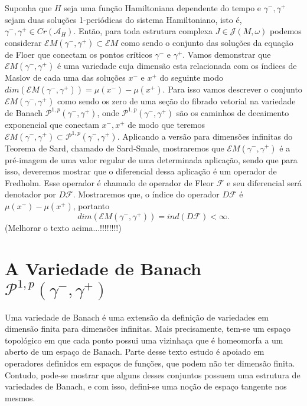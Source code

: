 \documentclass[12pt]{book}
\newcommand{\caminhosexponenciaisconectantes}[2]{\mathcal{P}^{1,p}(#1, #2)}
\newcommand{\caminhosexponenciaisconectantespadrao}{\caminhosexponenciaisconectantes{\gamma^{-}}{\gamma^{+}}}
\newcommand{\diferencialfloer}{D\operadorFloer}
\newcommand{\energiafinitaM}{\mathcal{E}M}
\newcommand{\energiafinitaMconectante}{\energiafinitaM(\gamma^{-}, \gamma^{+})}
\newcommand{\estruturascomplexas}[2]{\mathcal{J}(#1, #2)}
\newcommand{\funcionalH}{\mathcal{A}_{H}}
\newcommand{\operadorFloer}{\mathcal{F}}
\newcommand{\pontoscriticos}[1]{\textit{Cr}(#1)}
\newcommand{\vermelho}[1]{{\color{red}#1}}
\begin{document}
	Suponha que $H$ seja uma função Hamiltoniana dependente do tempo e $\gamma^{-}, \gamma^{+}$ sejam duas soluções 1-periódicas do sistema Hamiltoniano, isto é, $\gamma^{-}, \gamma^{+} \in \pontoscriticos{\funcionalH}$. Então, para toda estrutura complexa $J \in \estruturascomplexas{M}{\omega}$ podemos considerar $\energiafinitaMconectante \subset \energiafinitaM$ como sendo o conjunto das soluções da equação de Floer que conectam os pontos críticos $\gamma^{-}$ e $\gamma^{+}$. Vamos demonstrar que $\energiafinitaMconectante$ é uma variedade cuja dimensão esta relacionada com os índices de Maslov de cada uma das soluções $x^{-}$ e $x^{+}$ do seguinte modo $dim(\energiafinitaMconectante) = \mu(x^{-})-\mu(x^{+})$. Para isso vamos descrever o conjunto $\energiafinitaMconectante$ como sendo os zero de uma seção do fibrado vetorial na variedade de Banach $\caminhosexponenciaisconectantespadrao$, onde $\caminhosexponenciaisconectantespadrao$ são os caminhos de decaimento exponencial que conectam $x^{-}, x^{+}$ de modo que teremos $\energiafinitaMconectante \subset \caminhosexponenciaisconectantespadrao$. Aplicando a versão para dimensões infinitas do Teorema de Sard, chamado de Sard-Smale, mostraremos que $\energiafinitaMconectante$ é a pré-imagem de uma valor regular de uma determinada aplicação, sendo que para isso, deveremos mostrar que o diferencial dessa aplicação é um operador de Fredholm. Esse operador é chamado de operador de Fleor $\operadorFloer$ e seu diferencial será denotador por $\diferencialfloer$. Mostraremos que, o índice do operador $\diferencialfloer$ é $\mu(x^{-}) - \mu(x^{+})$, portanto 
	$$
	dim(\energiafinitaMconectante)=ind(\diferencialfloer) <\infty.
	$$
	\vermelho{(Melhorar o texto acima...!!!!!!!!)}
	
	\section{A Variedade de Banach $\caminhosexponenciaisconectantespadrao$}
	
	Uma variedade de Banach é uma extensão da definição de variedades em dimensão finita para dimensões infinitas. Mais precisamente, tem-se um espaço topológico em que cada ponto possui uma vizinhaça que é homeomorfa a um aberto de um espaço de Banach. Parte desse texto estudo é apoiado em operadores definidos em espaços de funções, que podem não ter dimensão finita. Contudo, pode-se mostrar que alguns desses conjuntos possuem uma estrutura de variedades de Banach, e com isso, defini-se uma noção de espaço tangente nos mesmos. 
	
\end{document}
